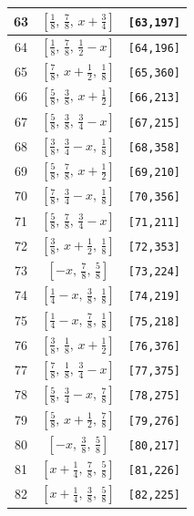 \documentclass[fleqn,8pt]{jsarticle}
\begin{document}
\begin{longtable}{ccc}
63 & $\left[ \frac{1}{8},\, \frac{7}{8},\, x + \frac{3}{4} \right]$ & {\tt [63,197]} \\ \hline
64 & $\left[ \frac{1}{8},\, \frac{7}{8},\, \frac{1}{2} - x \right]$ & {\tt [64,196]} \\ \hline
65 & $\left[ \frac{7}{8},\, x + \frac{1}{2},\, \frac{1}{8} \right]$ & {\tt [65,360]} \\ \hline
66 & $\left[ \frac{5}{8},\, \frac{3}{8},\, x + \frac{1}{2} \right]$ & {\tt [66,213]} \\ \hline
67 & $\left[ \frac{5}{8},\, \frac{3}{8},\, \frac{3}{4} - x \right]$ & {\tt [67,215]} \\ \hline
68 & $\left[ \frac{3}{8},\, \frac{3}{4} - x,\, \frac{1}{8} \right]$ & {\tt [68,358]} \\ \hline
69 & $\left[ \frac{5}{8},\, \frac{7}{8},\, x + \frac{1}{2} \right]$ & {\tt [69,210]} \\ \hline
70 & $\left[ \frac{7}{8},\, \frac{3}{4} - x,\, \frac{1}{8} \right]$ & {\tt [70,356]} \\ \hline
71 & $\left[ \frac{5}{8},\, \frac{7}{8},\, \frac{3}{4} - x \right]$ & {\tt [71,211]} \\ \hline
72 & $\left[ \frac{3}{8},\, x + \frac{1}{2},\, \frac{1}{8} \right]$ & {\tt [72,353]} \\ \hline
73 & $\left[ - x,\, \frac{7}{8},\, \frac{5}{8} \right]$ & {\tt [73,224]} \\ \hline
74 & $\left[ \frac{1}{4} - x,\, \frac{3}{8},\, \frac{1}{8} \right]$ & {\tt [74,219]} \\ \hline
75 & $\left[ \frac{1}{4} - x,\, \frac{7}{8},\, \frac{1}{8} \right]$ & {\tt [75,218]} \\ \hline
76 & $\left[ \frac{3}{8},\, \frac{1}{8},\, x + \frac{1}{2} \right]$ & {\tt [76,376]} \\ \hline
77 & $\left[ \frac{7}{8},\, \frac{1}{8},\, \frac{3}{4} - x \right]$ & {\tt [77,375]} \\ \hline
78 & $\left[ \frac{5}{8},\, \frac{3}{4} - x,\, \frac{7}{8} \right]$ & {\tt [78,275]} \\ \hline
79 & $\left[ \frac{5}{8},\, x + \frac{1}{2},\, \frac{7}{8} \right]$ & {\tt [79,276]} \\ \hline
80 & $\left[ - x,\, \frac{3}{8},\, \frac{5}{8} \right]$ & {\tt [80,217]} \\ \hline
81 & $\left[ x + \frac{1}{4},\, \frac{7}{8},\, \frac{5}{8} \right]$ & {\tt [81,226]} \\ \hline
82 & $\left[ x + \frac{1}{4},\, \frac{3}{8},\, \frac{5}{8} \right]$ & {\tt [82,225]} \\ \hline

\end{longtable}
\end{document}
